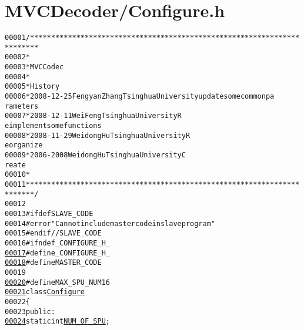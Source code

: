 \hypertarget{_configure_8h_source}{
\section{MVCDecoder/Configure.h}
}


\begin{footnotesize}\begin{alltt}
00001 \textcolor{comment}{/************************************************************************}
00002 \textcolor{comment}{ *}
00003 \textcolor{comment}{ * MVC Codec}
00004 \textcolor{comment}{ * }
00005 \textcolor{comment}{ * History}
00006 \textcolor{comment}{ * 2008-12-25       Fengyan Zhang   Tsinghua University     update some common pa
      rameters}
00007 \textcolor{comment}{ * 2008-12-11           Wei Feng                Tsinghua University             R
      eimplement some functions}
00008 \textcolor{comment}{ * 2008-11-29           Weidong Hu              Tsinghua University             R
      eorganize}
00009 \textcolor{comment}{ * 2006-2008            Weidong Hu              Tsinghua University             C
      reate}
00010 \textcolor{comment}{ * }
00011 \textcolor{comment}{ ************************************************************************/}
00012 
00013 \textcolor{preprocessor}{#ifdef SLAVE\_CODE}
00014 \textcolor{preprocessor}{}\textcolor{preprocessor}{#error "Can not include master code in slave program"}
00015 \textcolor{preprocessor}{}\textcolor{preprocessor}{#endif // SLAVE\_CODE}
00016 \textcolor{preprocessor}{}\textcolor{preprocessor}{#ifndef \_CONFIGURE\_H\_}
\hypertarget{_configure_8h_source_l00017}{}\hyperlink{_configure_8h_ad26ecb9c6092077de54c8b649a1e8c72}{00017} \textcolor{preprocessor}{}\textcolor{preprocessor}{#define \_CONFIGURE\_H\_}
\hypertarget{_configure_8h_source_l00018}{}\hyperlink{_configure_8h_aac0db9a0280340fa820b89366c85d392}{00018} \textcolor{preprocessor}{}\textcolor{preprocessor}{#define MASTER\_CODE}
00019 \textcolor{preprocessor}{}
\hypertarget{_configure_8h_source_l00020}{}\hyperlink{_configure_8h_ab58e1993d3e199885b35a2578cd2411a}{00020} \textcolor{preprocessor}{#define  MAX\_SPU\_NUM 16}
\hypertarget{_configure_8h_source_l00021}{}\hyperlink{class_configure}{00021} \textcolor{preprocessor}{}\textcolor{keyword}{class }\hyperlink{class_configure}{Configure}
00022 \{
00023 \textcolor{keyword}{public}:
\hypertarget{_configure_8h_source_l00024}{}\hyperlink{class_configure_ac48067b7f9d47427e932b4c44f4c9248}{00024}         \textcolor{keyword}{static} \textcolor{keywordtype}{int} \hyperlink{class_configure_ac48067b7f9d47427e932b4c44f4c9248}{NUM_OF_SPU};

\end{alltt}
\end{footnotesize}
